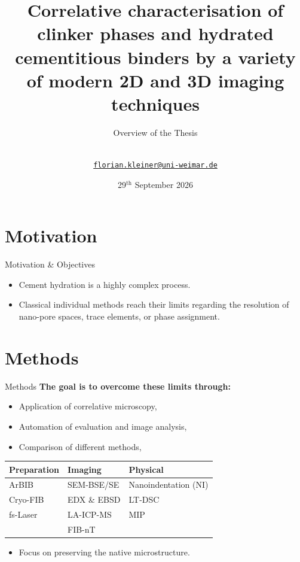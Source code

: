\documentclass[10pt,aspectratio=169]{beamer}
\title[Dissertation]
{Correlative characterisation of clinker phases and hydrated cementitious binders by a variety of modern 2D and 3D imaging techniques}
\subtitle{Overview of the Thesis}
\date{29$^\text{th}$ September 2026}
\author[\shortauthor]{
  \shortauthor\,\orcidlink{\orcid}\\
  \href{mailto:florian.kleiner@uni-weimar.de}{{\tt florian.kleiner@uni-weimar.de}}
}
\institute[Bauhaus-Universität Weimar]{
  Bauhaus-Universität Weimar\\
  Fak. B\&U\\
  Prof. Werkstoffe des Bauens
}
\begin{document}
{\BUWtitlebg
\begin{frame}
  \titlepage

\end{frame}}


\section{Motivation}
\begin{frame}{Motivation \& Objectives}
  \begin{itemize}
    \item Cement hydration is a highly complex process.
    \item Classical individual methods reach their limits regarding the resolution of nano-pore spaces, trace elements, or phase assignment.
  \end{itemize}
  
  \begin{center}
  \end{center}
\end{frame}


\section{Methods}
\begin{frame}{Methods}
  \textbf{The goal is to overcome these limits through:}
  \begin{itemize}
    \item Application of correlative microscopy,
    \item Automation of evaluation and image analysis,
    \item Comparison of different methods,
  \end{itemize}
  \begin{center}
    \begin{tabular}{lll}
      \toprule
      \textbf{Preparation} & \textbf{Imaging} & \textbf{Physical} \\
      \midrule
      ArBIB & SEM-BSE/SE & Nanoindentation (NI) \\
      Cryo-FIB & EDX \& EBSD & LT-DSC \\
      fs-Laser & LA-ICP-MS & MIP \\
       & FIB-nT & \\
      \bottomrule
    \end{tabular}
  \end{center}
  
  \begin{itemize}
    \item Focus on preserving the native microstructure.
  \end{itemize}
\end{frame}
\end{document}
